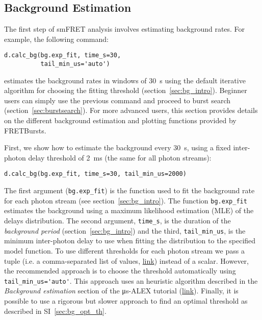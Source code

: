 \subsection{Background Estimation}
\label{sec:bg_calc}

The first step of smFRET analysis involves estimating background rates.
For example, the following command:

\begin{lstlisting}
d.calc_bg(bg.exp_fit, time_s=30, 
          tail_min_us='auto')
\end{lstlisting}

\noindent estimates the background rates in windows of 30~s
using the default iterative algorithm for choosing the
fitting threshold (section~\ref{sec:bg_intro}).  %
Beginner users can simply use the previous command and 
proceed to burst search (section~\ref{sec:burstsearch}). %
For more advanced users, this section provides details on 
the different background estimation and plotting functions 
provided by FRETBursts.

First, we show how to estimate the background every 30~s, 
using a fixed inter-photon delay threshold of 2~ms 
(the same for all photon streams):

\begin{lstlisting}
d.calc_bg(bg.exp_fit, time_s=30, tail_min_us=2000)
\end{lstlisting}

The first argument (\verb|bg.exp_fit|) is the function used to fit the
background rate for each photon stream (see section~\ref{sec:bg_intro}).
The function
\verb|bg.exp_fit| estimates the background using a maximum likelihood estimation
(MLE) of the delays distribution.
The second argument, \verb|time_s|, is the duration of the
\textit{background period} (section~\ref{sec:bg_intro}) and the third, \verb|tail_min_us|,
is the minimum inter-photon delay to use when fitting the distribution to the specified model function.
To use different thresholds for each photon stream we pass a
tuple (i.e. a comma-separated list of values, \href{https://docs.python.org/3.5/tutorial/datastructures.html#tuples-and-sequences}{link}) instead of a scalar.
However, the recommended approach is to choose the threshold automatically using
\verb|tail_min_us='auto'|. This approach uses an heuristic algorithm described in the
\textit{Background estimation} section of the μs-ALEX tutorial 
(\href{http://nbviewer.jupyter.org/github/tritemio/FRETBursts_notebooks/blob/master/notebooks/FRETBursts%20-%20us-ALEX%20smFRET%20burst%20analysis.ipynb#Background-estimation}{link}).
Finally, it is possible to use a rigorous but slower approach to find an optimal
threshold as described in SI~\ref{sec:bg_opt_th}.

